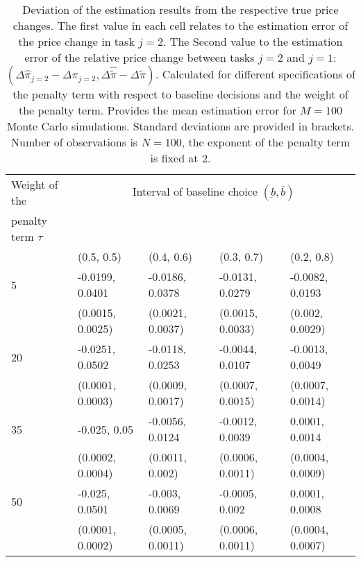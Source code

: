 \documentclass{article}
\newcommand\B{\rule[-1.5ex]{0pt}{0pt}}							%
\begin{document}
		\begin{table}
		\begin{tabular}{lllll}
		\toprule
		Weight of the 		& \multicolumn{4}{c}{Interval of baseline choice $(\underbar{b}, \bar{b})$}						\\
		penalty term $\tau$	&						&						&						&						\\				
		\cmidrule{2-5}
						  	&  (0.5, 0.5)			&  (0.4, 0.6)			&  (0.3, 0.7)			&  (0.2, 0.8)			\\
		\midrule										
		5					&  -0.0199, 0.0401		&  -0.0186, 0.0378		&  -0.0131, 0.0279		&  -0.0082, 0.0193		\\ \B
					      	&  (0.0015, 0.0025)		&  (0.0021, 0.0037)		&  (0.0015, 0.0033)		&  (0.002, 0.0029)		\\
		20					&  -0.0251, 0.0502		&  -0.0118, 0.0253		&  -0.0044, 0.0107		&  -0.0013, 0.0049		\\ \B
						  	&  (0.0001, 0.0003)		&  (0.0009, 0.0017)		&  (0.0007, 0.0015)		&  (0.0007, 0.0014)		\\
		35					&  -0.025, 0.05			&  -0.0056, 0.0124		&  -0.0012, 0.0039		&  0.0001, 0.0014		\\ \B
						  	&  (0.0002, 0.0004)		&  (0.0011, 0.002)		&  (0.0006, 0.0011)		&  (0.0004, 0.0009)		\\
		50					&  -0.025, 0.0501		&  -0.003, 0.0069		&  -0.0005, 0.002		&  0.0001, 0.0008		\\ \B
						 	&  (0.0001, 0.0002)		&  (0.0005, 0.0011)		&  (0.0006, 0.0011)		&  (0.0004, 0.0007)		\\
		\bottomrule

		\end{tabular}
		\caption{Deviation of the estimation results from the respective true price changes. The first value in each cell relates to the estimation error of the price change in task $j=2$. The Second value to the estimation error of the relative price change between tasks $j=2$ and $j=1$: $(\Delta \hat{\pi}_{j=2} - \Delta \pi_{j=2},  \Delta \hat{\tilde{\pi}} - \Delta \tilde{\pi})$. Calculated for different specifications of the penalty term with respect to baseline decisions and the weight of the penalty term. Provides the mean estimation error for $M = 100$ Monte Carlo simulations. Standard deviations are provided in brackets. Number of observations is $N = 100$, the exponent of the penalty term is fixed at 2.}
		\label{tab:est_rslt_differences_pw}
		\end{table}
\end{document}
